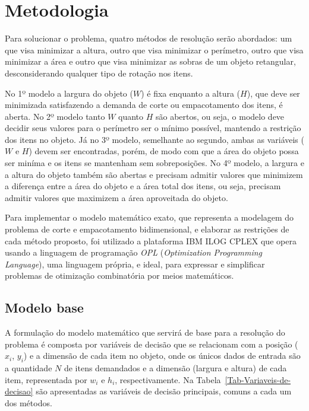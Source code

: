 \section{Metodologia}
    
    Para solucionar o problema, quatro métodos de resolução serão abordados: um que visa minimizar a altura, outro que visa minimizar o perímetro, outro que visa minimizar a área e outro que visa minimizar as sobras de um objeto retangular, desconsiderando qualquer tipo de rotação nos itens.

    No 1º modelo a largura do objeto ($W$) é fixa enquanto a altura ($H$), que deve ser minimizada satisfazendo a demanda de corte ou empacotamento dos itens, é aberta. No 2º modelo tanto $W$ quanto $H$ são abertos, ou seja, o modelo deve decidir seus valores para o perímetro ser o mínimo possível, mantendo a restrição dos itens no objeto. Já no 3º modelo, semelhante ao segundo, ambas as variáveis ($W$ e $H$) devem ser encontradas, porém, de modo com que a área do objeto possa ser miníma e os itens se mantenham sem sobreposições. No 4º modelo, a largura e a altura do objeto também são abertas e precisam admitir valores que minimizem a diferença entre a área do objeto e a área total dos itens, ou seja, precisam admitir valores que maximizem a área aproveitada do objeto.

    Para implementar o modelo matemático exato, que representa a modelagem do problema de corte e empacotamento bidimensional, e elaborar as restrições de cada método proposto, foi utilizado a plataforma IBM ILOG CPLEX que opera usando a linguagem de programação \emph{OPL} (\emph{Optimization Programming Language}), uma linguagem própria, e ideal, para expressar e simplificar problemas de otimização combinatória por meios matemáticos.


    \subsection{Modelo base}
    
        A formulação do modelo matemático que servirá de base para a resolução do problema é composta por variáveis de decisão que se relacionam com a posição ($x_i$, $y_i$) e a dimensão de cada item no objeto, onde os únicos dados de entrada são a quantidade $N$ de itens demandados e a dimensão (largura e altura) de cada item, representada por ${w}_i$ e ${h}_i$, respectivamente. Na Tabela~\ref{Tab-Variaveis-de-decisao} são apresentadas as variáveis de decisão principais, comuns a cada um dos métodos.

